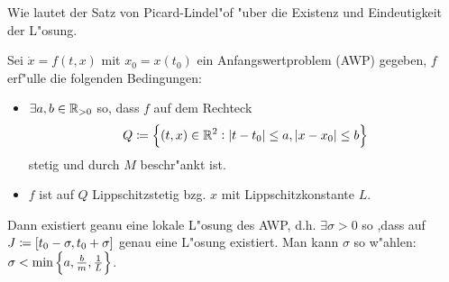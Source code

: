 \documentclass[9pt]{article}
\newcommand{\R}[1]{%
	\ifthenelse{\equal{#1}{}}
		{\mathbb{R}}
		{\mathbb{R}^#1}}%
\newenvironment{field}{}{\newpage}
\newif\ifnote
\newenvironment{note}{\notetrue}{\notefalse}
\newcommand{\localtag}{}
\newcommand{\globaltag}{}
\newcommand{\uuid}{}
\newcommand{\tags}[1]{
    \ifnote 
        \renewcommand{\localtag}{#1}
    \else
        \renewcommand{\globaltag}{#1}
    \fi 
    }
\newcommand{\xplain}[1]{\renewcommand{\uuid}{#1}}
\begin{document}
\begin{note}
	\xplain{UUID}
	\tags{satz, picard-lindeloef, 3.4.2}
	
	\begin{field}  %
		Wie lautet der Satz von Picard-Lindel"of "uber die Existenz und Eindeutigkeit der L"osung.
	\end{field}
	
	\begin{field}  %
		Sei $\dot{x} = f(t,x)$ mit $x_0= x(t_0)$ ein Anfangswertproblem (AWP) gegeben, $f$ erf"ulle die folgenden Bedingungen:
		\begin{itemize}
			\item $\exists a,b \in \R{}_{>0}$ so, dass $f$ auf dem Rechteck
			\begin{equation*}
				Q\coloneqq \qty{(t,x) \in \R{2}: \abs{t-t_0} \leq a, \abs{x-x_0} \leq b}
			\end{equation*}
			stetig und durch $M$ beschr"ankt ist. 
			\item $f$ ist auf $Q$ Lippschitzstetig bzg. $x$ mit Lippschitzkonstante $L$. 
		\end{itemize}
		Dann existiert geanu eine lokale L"osung des AWP, d.h. $\exists \sigma>0$ so ,dass auf
			$J\coloneqq \qty[t_0 - \sigma, t_0 + \sigma]$  genau eine L"osung existiert. Man kann $\sigma$ so w"ahlen: $\sigma < \min\qty{a, \frac{b}{m}, \frac{1}{L}}$.
	\end{field}
\end{note}

\begin{note}
	\xplain{UUID}
	\tags{definition, satz, DGL-System}
	
	\begin{field}  %
		
	\end{field}
	
	\begin{field}  %
		
	\end{field}
\end{note}
\end{document}
